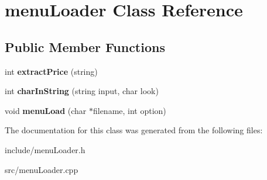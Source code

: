 \hypertarget{classmenu_loader}{\section{menu\-Loader Class Reference}
\label{classmenu_loader}
}
\subsection*{Public Member Functions}
\begin{DoxyCompactItemize}
\item 
\hypertarget{classmenu_loader_a6e83e799b1b819d0e31a20e1d0be88ad}{int {\bfseries extract\-Price} (string)}\label{classmenu_loader_a6e83e799b1b819d0e31a20e1d0be88ad}

\item 
\hypertarget{classmenu_loader_aa7b8ec960e4893d91de8fc162725aeb5}{int {\bfseries char\-In\-String} (string input, char look)}\label{classmenu_loader_aa7b8ec960e4893d91de8fc162725aeb5}

\item 
\hypertarget{classmenu_loader_aaed3671d68d82634134fae7dcc21f40e}{void {\bfseries menu\-Load} (char $\ast$filename, int option)}\label{classmenu_loader_aaed3671d68d82634134fae7dcc21f40e}

\end{DoxyCompactItemize}


The documentation for this class was generated from the following files\-:\begin{DoxyCompactItemize}
\item 
include/menu\-Loader.\-h\item 
src/menu\-Loader.\-cpp\end{DoxyCompactItemize}
